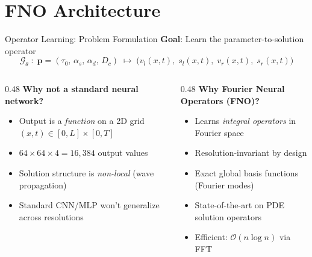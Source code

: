 \documentclass[aspectratio=169,12pt]{beamer}
\newcommand{\G}{\mathcal{G}_\theta}
\newcommand{\vl}{v_l}
\newcommand{\vr}{v_r}
\newcommand{\ssl}{s_l}
\newcommand{\ssr}{s_r}
\begin{document}
\section{FNO Architecture}

\begin{frame}{Operator Learning: Problem Formulation}
  \textbf{Goal}: Learn the parameter-to-solution operator
  \[
    \G\;:\; \bm{p} = (\tau_0,\,\alpha_s,\,\alpha_d,\,D_c)
    \;\longmapsto\;
    \bigl(\vl(x,t),\;\ssl(x,t),\;\vr(x,t),\;\ssr(x,t)\bigr)
  \]

  \vspace{6pt}
  \begin{columns}[T]
    \begin{column}{0.48\textwidth}
      \textbf{Why not a standard neural network?}
      \begin{itemize}
        \item Output is a \textit{function} on a 2D grid $(x,t) \in [0,L]\times[0,T]$
        \item $64 \times 64 \times 4 = 16{,}384$ output values
        \item Solution structure is \textit{non-local} (wave propagation)
        \item Standard CNN/MLP won't generalize across resolutions
      \end{itemize}
    \end{column}
    \begin{column}{0.48\textwidth}
      \textbf{Why Fourier Neural Operators (FNO)?}
      \begin{itemize}
        \item Learns \textit{integral operators} in Fourier space
        \item Resolution-invariant by design
        \item Exact global basis functions (Fourier modes)
        \item State-of-the-art on PDE solution operators
        \item Efficient: $\mathcal{O}(n \log n)$ via FFT
      \end{itemize}
    \end{column}
  \end{columns}
\end{frame}
\end{document}
